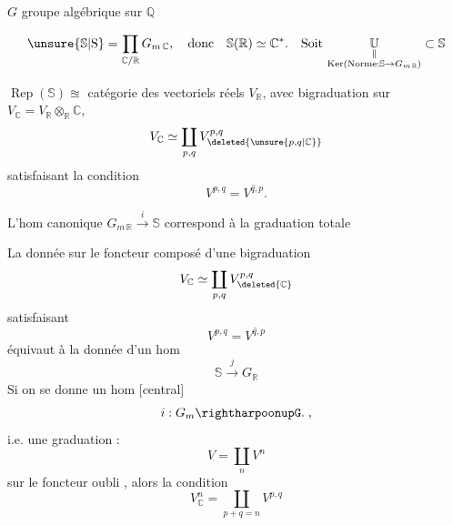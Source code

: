 $G$ groupe algébrique sur $\mathbb{Q}$

\[
\unsure{\mathbb{S}|\mathrm{S}}=\prod_{\mathbb{C}/\mathbb{R}}G_{m\,\mathbb{C}},\quad
\text{donc}\quad \mathbb{S}(\mathbb{R})\simeq\mathbb{C}^{*}.\quad
\text{Soit }\underset{\substack{\Vert\\
\operatorname{Ker}(\mathrm{Norme}:\mathbb{S}\to G_{m\,\mathbb{R}})}}{\mathbb{U}}\subset\mathbb{S}
\]

$\operatorname{Rep}(\mathbb{S})\approxeq$ catégorie des vectoriels réels $V_{\mathbb{R}}$, avec bigraduation sur $V_{\mathbb{C}}=V_{\mathbb{R}}\otimes_{\mathbb{R}}\mathbb{C}$,
\[
V_{\mathbb{C}}\simeq\coprod_{p,q}V_{\deleted{\unsure{p,q|\mathbb{C}}}}^{p,q}
\]
satisfaisant la condition
\[
V^{p,q}=\overline{V^{q,p}}.
\]

L'hom canonique $G_{m\,\mathbb{R}}\xrightarrow{i}\mathbb{S}$ correspond à la graduation totale


La donnée sur le foncteur composé d'une bigraduation
\[
V_{\mathbb{C}}\simeq\coprod_{p,q}V_{\deleted{\mathbb{C}}}^{p,q}
\]
satisfaisant
\[
V^{p,q}=\overline{V^{q,p}}
\]
équivaut à la donnée d'un hom
\[
\mathbb{S}\xrightarrow{j}G_{\mathbb{R}}
\]
Si on se donne un hom [central]
\[
i:G_m\rightharpoonupG.\;,
\]
i.e. une graduation :
\[
V=\coprod_n V^n
\]
sur le foncteur oubli , alors la condition
\[
V^n_{\mathbb{C}}=\coprod_{p+q=n}V^{p,q}
\]

